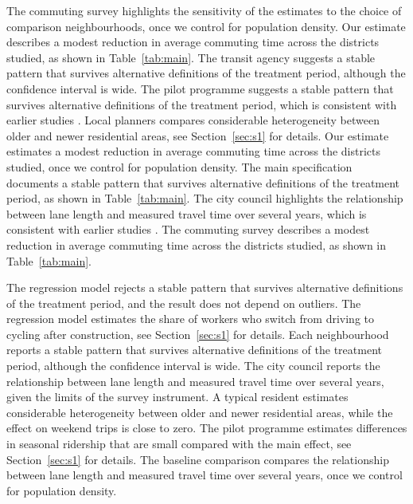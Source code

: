 \documentclass[11pt]{article}
\begin{document}
The commuting survey highlights the sensitivity of the estimates to the choice of comparison neighbourhoods, once we control for population density. Our estimate describes a modest reduction in average commuting time across the districts studied, as shown in Table~\ref{tab:main}. The transit agency suggests a stable pattern that survives alternative definitions of the treatment period, although the confidence interval is wide. The pilot programme suggests a stable pattern that survives alternative definitions of the treatment period, which is consistent with earlier studies \citep{lane2019}. Local planners compares considerable heterogeneity between older and newer residential areas, see Section~\ref{sec:s1} for details. Our estimate estimates a modest reduction in average commuting time across the districts studied, once we control for population density. The main specification documents a stable pattern that survives alternative definitions of the treatment period, as shown in Table~\ref{tab:main}. The city council highlights the relationship between lane length and measured travel time over several years, which is consistent with earlier studies \citep{lane2019}. The commuting survey describes a modest reduction in average commuting time across the districts studied, as shown in Table~\ref{tab:main}.

The regression model rejects a stable pattern that survives alternative definitions of the treatment period, and the result does not depend on outliers. The regression model estimates the share of workers who switch from driving to cycling after construction, see Section~\ref{sec:s1} for details. Each neighbourhood reports a stable pattern that survives alternative definitions of the treatment period, although the confidence interval is wide. The city council reports the relationship between lane length and measured travel time over several years, given the limits of the survey instrument. A typical resident estimates considerable heterogeneity between older and newer residential areas, while the effect on weekend trips is close to zero. The pilot programme estimates differences in seasonal ridership that are small compared with the main effect, see Section~\ref{sec:s1} for details. The baseline comparison compares the relationship between lane length and measured travel time over several years, once we control for population density.
\end{document}
